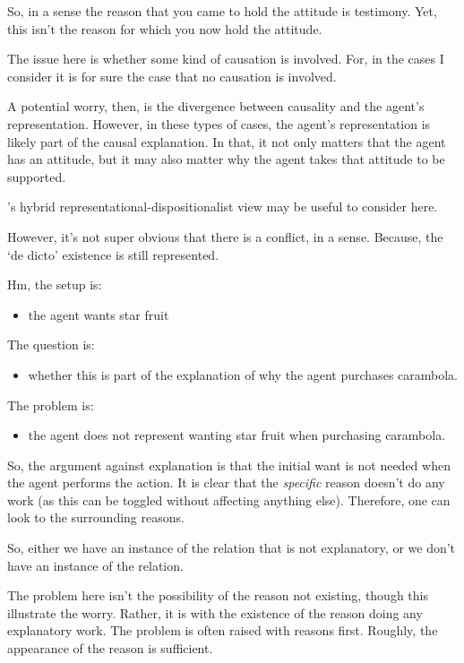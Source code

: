 \documentclass[10pt]{article}
\begin{document}
So, in a sense the reason that you came to hold the attitude is testimony.
Yet, this isn't the reason for which you now hold the attitude.

The issue here is whether some kind of causation is involved.
For, in the cases I consider it is for sure the case that no causation is involved.

A potential worry, then, is the divergence between causality and the agent's representation.
However, in these types of cases, the agent's representation is likely part of the causal explanation.
In that, it not only matters that the agent has an attitude, but it may also matter why the agent takes that attitude to be supported.

\citeauthor{Neta:2019aa}'s hybrid representational-dispositionalist view may be useful to consider here.

However, it's not super obvious that there is a conflict, in a sense.
Because, the `de dicto' existence is still represented.

Hm, the setup is:
\begin{itemize}
\item the agent wants star fruit
\end{itemize}
The question is:
\begin{itemize}
\item whether this is part of the explanation of why the agent purchases carambola.
\end{itemize}
The problem is:
\begin{itemize}
\item the agent does not represent wanting star fruit when purchasing carambola.
\end{itemize}

So, the argument against explanation is that the initial want is not needed when the agent performs the action.
It is clear that the \emph{specific} reason doesn't do any work (as this can be toggled without affecting anything else).
Therefore, one can look to the surrounding reasons.

So, either we have an instance of the relation that is not explanatory, or we don't have an instance of the relation.

{\color{red}
  The problem here isn't the possibility of the reason not existing, though this illustrate the worry.
  Rather, it is with the existence of the reason doing any explanatory work.
}
The problem is often raised with reasons first.
Roughly, the appearance of the reason is sufficient.
\end{document}
